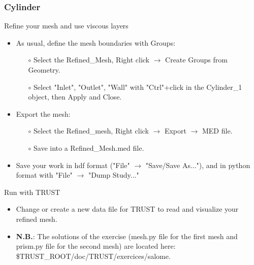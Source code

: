 \documentclass[10pt, hyperref={unicode=true,pdfusetitle, bookmarks=true,bookmarksnumbered=false,bookmarksopen=false, breaklinks=false,pdfborder={0 0 1},backref=true,colorlinks=true,linkcolor=darkblue,pageanchor}]{beamer}
\begin{document}
\begin{frame}
\frametitle{Cylinder}

\begin{block}{Refine your mesh and use viscous layers}
\begin{itemize}
\item As usual, define the mesh boundaries with Groups:
    \begin{itemize}
    \item [$\circ$] Select the Refined\_Mesh, Right click $\rightarrow$ Create Groups from Geometry.
    \item [$\circ$] Select "Inlet", "Outlet", "Wall" with "Ctrl"+click in the Cylinder\_1 object, then Apply and Close.
    \end{itemize}

\item Export the mesh:
    \begin{itemize}
    \item [$\circ$] Select the Refined\_mesh, Right click $\rightarrow$ Export $\rightarrow$ MED file.
    \item [$\circ$] Save into a Refined\_Mesh.med file.
    \end{itemize}

\item Save your work in hdf format ("File" $\rightarrow$ "Save/Save As..."), and in python format with "File" $\rightarrow$ "Dump Study..."
\end{itemize}
\end{block}


\begin{block}{Run with TRUST}
\begin{itemize}
\item Change or create a new data file for TRUST to read and visualize your refined mesh.

\item \textbf{N.B.}: The solutions of the exercise (mesh.py file for the first mesh and prism.py file for the second mesh) are located here: \$TRUST\_ROOT/doc/TRUST/exercices/salome.
\end{itemize}

\end{block}
\end{frame}
\end{document}
